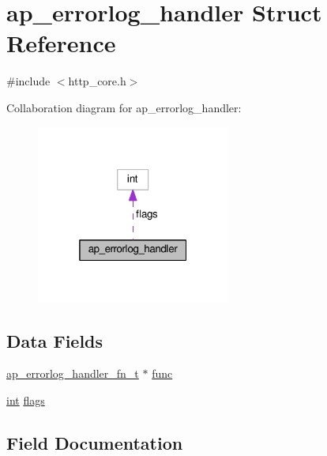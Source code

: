 \hypertarget{structap__errorlog__handler}{}\section{ap\+\_\+errorlog\+\_\+handler Struct Reference}
\label{structap__errorlog__handler}


{\ttfamily \#include $<$http\+\_\+core.\+h$>$}



Collaboration diagram for ap\+\_\+errorlog\+\_\+handler\+:
\nopagebreak
\begin{figure}[H]
\begin{center}
\leavevmode
\includegraphics[width=181pt]{structap__errorlog__handler__coll__graph}
\end{center}
\end{figure}
\subsection*{Data Fields}
\begin{DoxyCompactItemize}
\item 
\hyperlink{group__APACHE__CORE__HTTPD_gae2b87862d08783b06d2f1b6dfb161bca}{ap\+\_\+errorlog\+\_\+handler\+\_\+fn\+\_\+t} $\ast$ \hyperlink{structap__errorlog__handler_a48525891927bfb591289cd5ec92b8d4e}{func}
\item 
\hyperlink{pcre_8txt_a42dfa4ff673c82d8efe7144098fbc198}{int} \hyperlink{structap__errorlog__handler_aebc80b5baa533af896473199c1c27d9d}{flags}
\end{DoxyCompactItemize}


\subsection{Field Documentation}
